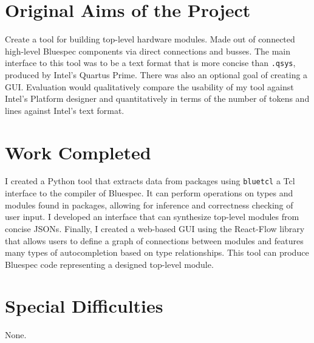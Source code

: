 \documentclass[12pt]{report}
\begin{document}
\section*{Original Aims of the Project}

Create a tool for building top-level hardware modules. Made out of connected high-level Bluespec components via direct connections and busses. The main interface to this tool was to be a text format that is more concise than \verb!.qsys!, produced by Intel's Quartus Prime. There was also an optional goal of creating a GUI. Evaluation would qualitatively compare the usability of my tool against Intel's Platform designer and quantitatively in terms of the number of tokens and lines against Intel's text format.

\section*{Work Completed}

I created a Python tool that extracts data from packages using \verb!bluetcl! a Tcl interface to the compiler of Bluespec. It can perform operations on types and modules found in packages, allowing for inference and correctness checking of user input. I developed an interface that can synthesize top-level modules from concise JSONs. Finally, I created a web-based GUI using the React-Flow library that allows users to define a graph of connections between modules and features many types of autocompletion based on type relationships. This tool can produce Bluespec code representing a designed top-level module.

\section*{Special Difficulties}

None.




\tableofcontents
\end{document}
